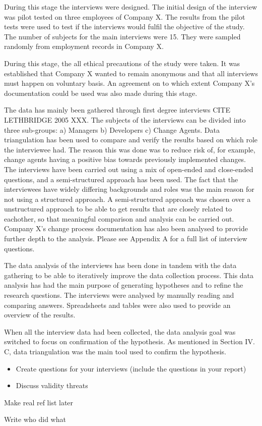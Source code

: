 \documentclass[times, 10pt,twocolumn]{IEEEtran}
\begin{document}
During this stage the interviews were designed. The initial design of the interview was pilot tested on three employees of Company X. The results from the pilot tests were used to test if the interviews would fulfil the objective of the study. The number of subjects for the main interviews were 15. They were sampled randomly from employment records in Company X. 

During this stage, the all ethical precautions of the study were taken. It was established that Company X wanted to remain anonymous and that all interviews must happen on voluntary basis. An agreement on to which extent Company X's documentation could be used was also made during this stage. 

The data has mainly been gathered through first degree interviews CITE LETHBRIDGE 2005 XXX. The subjects of the interviews can be divided into three sub-groups: a) Managers b) Developers c) Change Agents. Data triangulation has been used to compare and verify the results based on which role the interviewee had. The reason this was done was to reduce risk of, for example, change agents having a positive bias towards previously implemented changes. The interviews have been carried out using a mix of open-ended and close-ended questions, and a semi-structured approach has been used. The fact that the interviewees have widely differing backgrounds and roles was the main reason for not using a structured approach. A semi-structured approach was chosen over a unstructured approach to be able to get results that are closely related to eachother, so that meaningful comparison and analysis can be carried out. Company X's change process documentation has also been analysed to provide further depth to the analysis. Please see Appendix A for a full list of interview questions.

The data analysis of the interviews has been done in tandem with the data gathering to be able to iteratively improve the data collection process. This data analysis has had the main purpose of generating hypotheses and to refine the research questions. The interviews were analysed by manually reading and comparing answers. Spreadsheets and tables were also used to provide an overview of the results. 

When all the interview data had been collected, the data analysis goal was switched to focus on confirmation of the hypothesis. As mentioned in Section IV. C, data triangulation was the main tool used to confirm the hypothesis. 









\begin{itemize}
\item Create questions for your interviews (include the questions in your report)
\item Discuss validity threats
\end{itemize}

Make real ref list later


Write who did what
\end{document}
